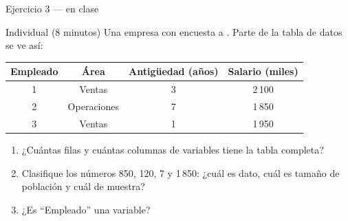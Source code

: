 \documentclass[aspectratio=169,10pt]{beamer}
\begin{document}
\begin{frame}{Ejercicio 3 — en clase}
  \begin{alertblock}{Individual (8 minutos)}
    Una empresa con  encuesta a . Parte
    de la tabla de datos se ve así:

    \vspace{0.2cm}
    \centering\footnotesize
    \begin{tabular}{@{}cccc@{}}
      \toprule
      \textbf{Empleado} & \textbf{Área} & \textbf{Antigüedad (años)} &
      \textbf{Salario (miles)} \\
      \midrule
      1 & Ventas       & 3 & 2\,100 \\
      2 & Operaciones  & 7 & 1\,850 \\
      3 & Ventas       & 1 & 1\,950 \\
      \bottomrule
    \end{tabular}

    \vspace{0.2cm}
    \raggedright
    \begin{enumerate}
      \item ¿Cuántas filas y cuántas columnas de variables tiene la tabla completa?
      \item Clasifique los números 850, 120, 7 y 1\,850: ¿cuál es dato, cuál es
            tamaño de población y cuál de muestra?
      \item ¿Es ``Empleado'' una variable?
    \end{enumerate}
  \end{alertblock}
\end{frame}
\end{document}
